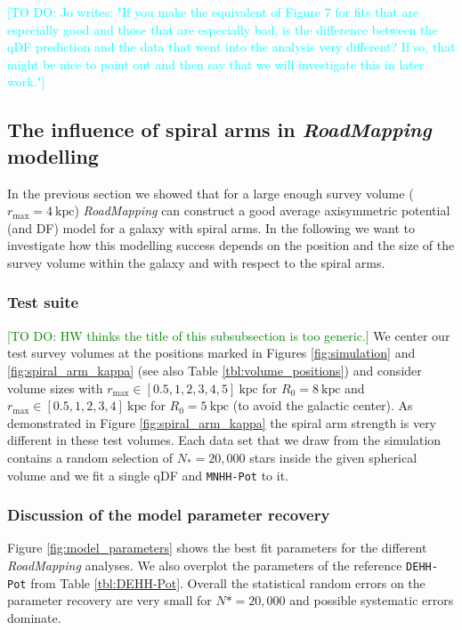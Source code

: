 \documentclass[iop,revtex4,numberedappendix,appendixfloats]{emulateapj}
\newcommand{\RM}{{\sl RoadMapping}}
\newcommand{\HW}[1]{\textcolor{Green}{#1}}
\newcommand{\Jo}[1]{\textcolor{Cyan}{#1}}
\begin{document}
\Jo{[TO DO: Jo writes: "If you make the equivalent of Figure 7 for fits that are especially good and those that are especially bad, is the difference between the qDF prediction and the data that went into the analysis very different? If so, that might be nice to point out and then say that we will investigate this in later work."]}

\subsection{The influence of spiral arms in \RM{} modelling} \label{sec:results_part2}

In the previous section we showed that for a large enough survey volume ($r_\text{max}=4~\text{kpc}$) \RM{} can construct a good average axisymmetric potential (and DF) model for a galaxy with spiral arms. In the following we want to investigate how this modelling success depends on the position and the size of the survey volume within the galaxy and with respect to the spiral arms.

\subsubsection{Test suite} \label{sec:suite}

\HW{[TO DO: HW thinks the title of this subsubsection is too generic.]}
We center our test survey volumes at the positions marked in Figures \ref{fig:simulation} and \ref{fig:spiral_arm_kappa} (see also Table \ref{tbl:volume_positions}) and consider volume sizes with $r_\text{max} \in [0.5,1,2,3,4,5]~\text{kpc}$ for $R_0 = 8~\text{kpc}$ and $r_\text{max} \in [0.5,1,2,3,4]~\text{kpc}$ for $R_0 = 5~\text{kpc}$ (to avoid the galactic center). As demonstrated in Figure \ref{fig:spiral_arm_kappa} the spiral arm strength is very different in these test volumes. Each data set that we draw from the simulation contains a random selection of $N_*=20,000$ stars inside the given spherical volume and we fit a single qDF and \texttt{MNHH-Pot} to it. 

\subsubsection{Discussion of the model parameter recovery} \label{sec:parameter recovery}

Figure \ref{fig:model_parameters} shows the best fit parameters for the different \RM{} analyses. We also overplot the parameters of the reference \texttt{DEHH-Pot} from Table \ref{tbl:DEHH-Pot}. Overall the statistical random errors on the parameter recovery are very small for $N*=20,000$ and possible systematic errors dominate. 
\end{document}
